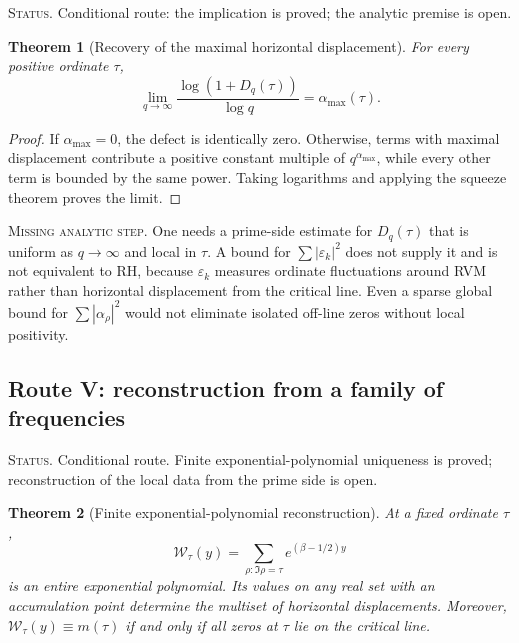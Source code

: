 \documentclass[11pt]{amsart}
\numberwithin{equation}{section}
\theoremstyle{plain}
\newtheorem{theorem}{Theorem}[section]
\theoremstyle{definition}
\theoremstyle{remark}
\newcommand{\1}{\mathbf{1}}
\newcommand{\statusnote}[1]{%
  \par\smallskip\noindent
  \begingroup\footnotesize\textsc{Status.} #1\endgroup
  \par\smallskip}
\newcommand{\missingnote}[1]{%
  \par\smallskip\noindent
  \begingroup\footnotesize\textsc{Missing analytic step.} #1\endgroup
  \par\smallskip}
\begin{document}
\statusnote{Conditional route: the implication is proved; the analytic premise is open.}
\begin{theorem}[Recovery of the maximal horizontal displacement]
\label{thm:large_q_growth_exponent}
For every positive ordinate $\tau$,
\begin{equation}
\lim_{q\to\infty}
\frac{\log(1+D_q(\tau))}{\log q}
=
\alpha_{\max}(\tau).
\label{eq:large_q_growth_exponent}
\end{equation}
\end{theorem}

\begin{proof}
If $\alpha_{\max}=0$, the defect is identically zero.  Otherwise, terms
with maximal displacement contribute a positive constant multiple of
$q^{\alpha_{\max}}$, while every other term is bounded by the same power.
Taking logarithms and applying the squeeze theorem proves the limit.
\end{proof}

\missingnote{One needs a prime-side estimate for $D_q(\tau)$ that is uniform
as $q\to\infty$ and local in $\tau$.  A bound for
$\sum|\varepsilon_k|^2$ does not supply it and is not equivalent to RH,
because $\varepsilon_k$ measures ordinate fluctuations around RVM rather
than horizontal displacement from the critical line.  Even a sparse global
bound for $\sum|\alpha_\rho|^2$ would not eliminate isolated off-line zeros
without local positivity.}

\subsection{Route V: reconstruction from a family of frequencies}
\label{subsec:route_family_q}

\statusnote{Conditional route.  Finite exponential-polynomial uniqueness is proved; reconstruction of the local data from the prime side is open.}
\begin{theorem}[Finite exponential-polynomial reconstruction]
\label{thm:q_family_reconstruction}
At a fixed ordinate $\tau$,
\begin{equation}
\mathcal W_\tau(y)
=
\sum_{\rho:\Im\rho=\tau}e^{(\beta-1/2)y}
\label{eq:q_family_exponential_polynomial}
\end{equation}
is an entire exponential polynomial.  Its values on any real set with an
accumulation point determine the multiset of horizontal displacements.
Moreover, $\mathcal W_\tau(y)\equiv m(\tau)$ if and only if all zeros at
$\tau$ lie on the critical line.
\end{theorem}
\end{document}

